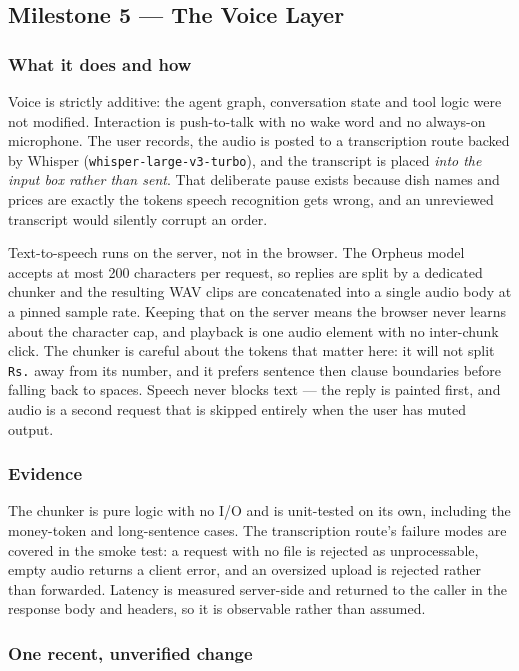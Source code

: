 \documentclass[11pt,a4paper]{article}
\newcommand{\code}[1]{\texttt{\small #1}}
\begin{document}
\subsection{Milestone 5 --- The Voice Layer}

\subsubsection*{What it does and how}

Voice is strictly additive: the agent graph, conversation state and tool logic
were not modified. Interaction is push-to-talk with no wake word and no
always-on microphone. The user records, the audio is posted to a transcription
route backed by Whisper (\code{whisper-large-v3-turbo}), and the transcript is
placed \emph{into the input box rather than sent}. That deliberate pause
exists because dish names and prices are exactly the tokens speech recognition
gets wrong, and an unreviewed transcript would silently corrupt an order.

Text-to-speech runs on the server, not in the browser. The Orpheus model
accepts at most 200 characters per request, so replies are split by a
dedicated chunker and the resulting WAV clips are concatenated into a single
audio body at a pinned sample rate. Keeping that on the server means the
browser never learns about the character cap, and playback is one audio
element with no inter-chunk click. The chunker is careful about the tokens
that matter here: it will not split \code{Rs.} away from its number, and it
prefers sentence then clause boundaries before falling back to spaces. Speech
never blocks text --- the reply is painted first, and audio is a second
request that is skipped entirely when the user has muted output.

\subsubsection*{Evidence}

The chunker is pure logic with no I/O and is unit-tested on its own, including
the money-token and long-sentence cases. The transcription route's failure
modes are covered in the smoke test: a request with no file is rejected as
unprocessable, empty audio returns a client error, and an oversized upload is
rejected rather than forwarded. Latency is measured server-side and returned
to the caller in the response body and headers, so it is observable rather
than assumed.

\subsubsection*{One recent, unverified change}
\end{document}
